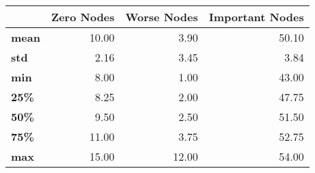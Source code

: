 \begin{tabular}{lrrr}
\toprule
{} &  Zero Nodes &  Worse Nodes &  Important Nodes \\
\midrule
\textbf{mean} &       10.00 &         3.90 &            50.10 \\
\textbf{std } &        2.16 &         3.45 &             3.84 \\
\textbf{min } &        8.00 &         1.00 &            43.00 \\
\textbf{25\% } &        8.25 &         2.00 &            47.75 \\
\textbf{50\% } &        9.50 &         2.50 &            51.50 \\
\textbf{75\% } &       11.00 &         3.75 &            52.75 \\
\textbf{max } &       15.00 &        12.00 &            54.00 \\
\bottomrule
\end{tabular}
